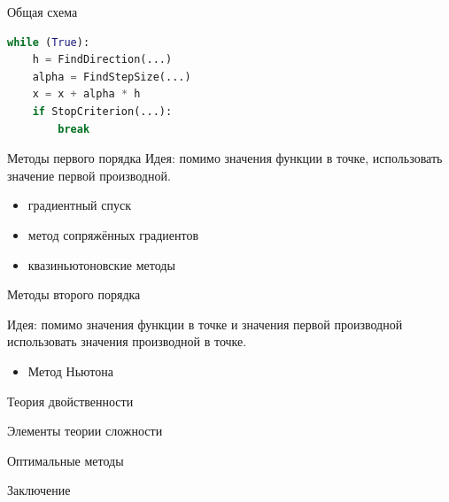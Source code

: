 \documentclass[12pt]{beamer}
\begin{document}
\begin{frame}[fragile]{Общая схема}

\begin{lstlisting}[language=Python]
while (True):
    h = FindDirection(...)
    alpha = FindStepSize(...)
    x = x + alpha * h
    if StopCriterion(...):
    	break
\end{lstlisting}

\end{frame}

\begin{frame}{Методы первого порядка}
Идея: помимо значения функции в точке, использовать значение первой производной.

\begin{itemize}
\item градиентный спуск
\item метод сопряжённых градиентов
\item квазиньютоновские методы
\end{itemize}

\end{frame}

\begin{frame}{Методы второго порядка}

Идея: помимо значения функции в точке и значения первой производной использовать значения {\color{red}{второй}} производной в точке.

\begin{itemize}
\item Метод Ньютона
\end{itemize}

\end{frame}

\begin{frame}{Теория двойственности}

\end{frame}

\begin{frame}{Элементы теории сложности}

\end{frame}

\begin{frame}{Оптимальные методы}

\end{frame}

\begin{frame}{Заключение}

\end{frame}
\end{document}
